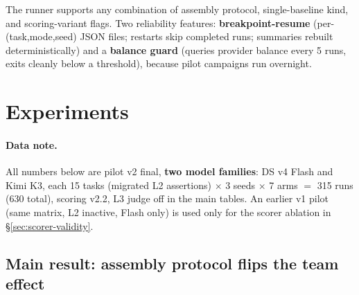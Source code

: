 \documentclass[sigconf,anonymous]{aamas}
\begin{document}
The runner supports any combination of assembly protocol, single-baseline kind, and scoring-variant flags. Two reliability features: \textbf{breakpoint-resume} (per-(task,mode,seed) JSON files; restarts skip completed runs; summaries rebuilt deterministically) and a \textbf{balance guard} (queries provider balance every 5 runs, exits cleanly below a threshold), because pilot campaigns run overnight.

\section{Experiments}
\label{sec:experiments}

\paragraph{Data note.} All numbers below are pilot v2 final, \textbf{two model families}: DS v4 Flash and Kimi K3, each 15 tasks (migrated L2 assertions) $\times$ 3 seeds $\times$ 7 arms $=$ 315 runs (630 total), scoring v2.2, L3 judge off in the main tables. An earlier v1 pilot (same matrix, L2 inactive, Flash only) is used only for the scorer ablation in \S\ref{sec:scorer-validity}.

\subsection{Main result: assembly protocol flips the team effect}
\label{sec:main}
\end{document}
